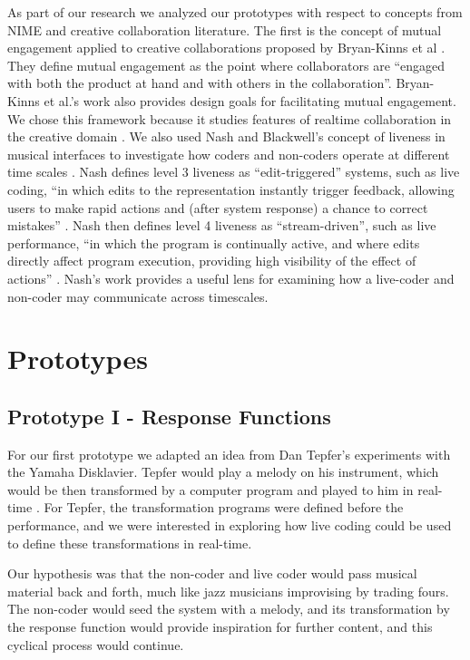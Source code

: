 \documentclass{nime-alternate}
\begin{document}
As part of our research we analyzed our prototypes with respect to concepts from NIME and creative collaboration literature. The first is the concept of mutual engagement applied to creative collaborations proposed by Bryan-Kinns et al \cite{bryan-kinns_exploring_2007}. They define mutual engagement as the point where collaborators are ``engaged with both the product at hand and with others in the collaboration''. Bryan-Kinns et al.'s work also provides design goals for facilitating mutual engagement. We chose this framework because it studies features of realtime collaboration in the creative domain \cite{bryan-kinns_exploring_2007}. We also used Nash and Blackwell's concept of liveness in musical interfaces to investigate how coders and non-coders operate at different time scales \cite{nash_liveness_2012}. Nash defines level 3 liveness as ``edit-triggered'' systems, such as live coding, ``in which edits to the representation instantly trigger feedback, allowing users to make rapid actions and (after system response) a chance to correct mistakes'' \cite{nash_liveness_2012}. Nash then defines level 4 liveness as ``stream-driven'', such as live performance, ``in which the program is continually active, and where edits directly affect program execution, providing high visibility of the effect of actions'' \cite{nash_liveness_2012}. Nash's work provides a useful lens for examining how a live-coder and non-coder may communicate across timescales.

\section{Prototypes}
\subsection{Prototype I - Response Functions}
For our first prototype we adapted an idea from Dan Tepfer's experiments with the Yamaha Disklavier. Tepfer would play a melody on his instrument, which would be then transformed by a computer program and played to him in real-time \cite{chinen_fascinating_2017}. For Tepfer, the transformation programs were defined before the performance, and we were interested in exploring how live coding could be used to define these transformations in real-time. 

Our hypothesis was that the non-coder and live coder would pass musical material back and forth, much like jazz musicians improvising by trading fours. The non-coder would seed the system with a melody, and its transformation by the response function would provide inspiration for further content, and this cyclical process would continue.
\end{document}
